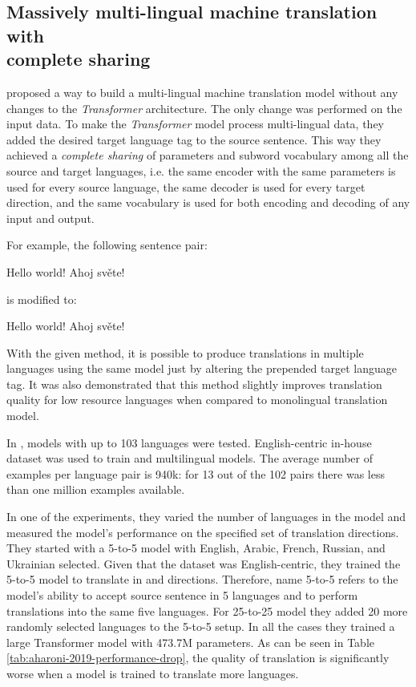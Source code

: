 \subsection{Massively multi-lingual machine translation with \\complete sharing}
\label{section:multitarget_theory}

\citet{johnson-etal-2017-googles} proposed a way to build a multi-lingual
machine translation model without any changes to the \emph{Transformer} architecture.
The only change was performed on the input data.
To make the \emph{Transformer} model process multi-lingual data,
they added the desired target language tag to the source sentence.
This way they achieved a \emph{complete sharing} of parameters and subword vocabulary
among all the source and target languages, i.e. the same encoder with the same
parameters is used for every source language, the same decoder is used for
every target direction, and the same vocabulary is used for both encoding
and decoding of any input and output.

For example, the following  sentence pair:
\begin{displayquote}
Hello world! \to{} Ahoj světe!
\end{displayquote}
is modified to:
\begin{displayquote}
 Hello world! \to{} Ahoj světe!
\end{displayquote}

With the given method, it is possible to produce translations in multiple
languages using the same model just by altering the prepended target language tag.
It was also demonstrated that this method slightly improves translation quality for 
low resource languages when compared to monolingual translation model.

In \cite{aharoni-etal-2019-massively}, models with up to 103 languages were tested.
English-centric in-house dataset was used to train  and
 multilingual models.
The average number of examples per language pair is 940k:
for 13 out of the 102 pairs there was less than one million examples available.

In one of the experiments, they varied the number of languages in the model and measured
the model's performance on the specified set of translation directions.
They started with a 5-to-5 model with English, Arabic, French, Russian, and Ukrainian selected.
Given that the dataset was English-centric, they trained the 5-to-5 model to translate
in  and  directions.
Therefore, name 5-to-5 refers to the model's ability to accept source sentence in 5 languages
and to perform translations into the same five languages.
For 25-to-25 model they added 20 more randomly selected languages to the 5-to-5 setup.
In all the cases they trained a large Transformer model with 473.7M parameters.
As can be seen in Table \ref{tab:aharoni-2019-performance-drop}, the quality of translation
is significantly worse when a model is trained to translate more languages.


